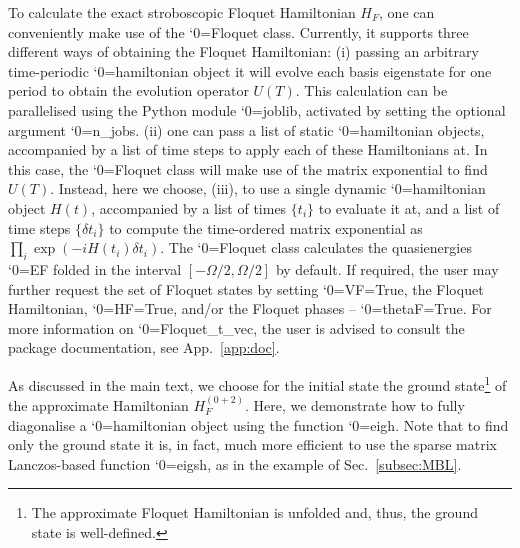 \documentclass{SciPost}
\newcommand\0{\scalebox{-1}[1]{0}}
\let\svttfamily\ttfamily
\renewcommand\ttfamily{\svttfamily\catcode`0=\active }
\renewcommand\texttt{\bgroup\ttfamily\texttthelp}
\def\texttthelp#1{#1\egroup}
\begin{document}

%
To calculate the exact stroboscopic Floquet Hamiltonian $H_F$, one can conveniently make use of the \texttt{Floquet} class. Currently, it supports three different ways of obtaining the Floquet Hamiltonian: (i) passing an arbitrary time-periodic \texttt{hamiltonian} object it will evolve each basis eigenstate for one period to obtain the evolution operator $U(T)$. This calculation can be parallelised using the Python module \texttt{joblib}, activated by setting the optional argument \texttt{n\_jobs}. (ii) one can pass a list of static \texttt{hamiltonian} objects, accompanied by a list of time steps to apply each of these Hamiltonians at. In this case, the \texttt{Floquet} class will make use of the matrix exponential to find $U(T)$. Instead, here we choose, (iii), to use a single dynamic \texttt{hamiltonian} object $H(t)$, accompanied by a list of times $\{t_i\}$ to evaluate it at, and a list of time steps $\{\delta t_i\}$ to compute the time-ordered matrix exponential as $\prod_i \exp(-iH(t_i)\delta t_i)$. The \texttt{Floquet} class calculates the quasienergies \texttt{EF} folded in the interval $[-\Omega/2,\Omega/2]$ by default. If required, the user may further request the set of Floquet states by setting \texttt{VF=True}, the Floquet Hamiltonian, \texttt{HF=True}, and/or the Floquet phases -- \texttt{thetaF=True}. For more information on \texttt{Floquet\_t\_vec}, the user is advised to consult the package documentation, see App.~\ref{app:doc}.

%
As discussed in the main text, we choose for the initial state the ground state\footnote{The approximate Floquet Hamiltonian is unfolded\cite{weinberg_FAPT} and, thus, the ground state is well-defined.} of the approximate Hamiltonian $H_F^{(0+2)}$. Here, we demonstrate how to fully diagonalise a \texttt{hamiltonian} object using the function \texttt{eigh}. Note that to find only the ground state it is, in fact, much more efficient to use the sparse matrix Lanczos-based function \texttt{eigsh}, as in the example of Sec.~\ref{subsec:MBL}.

%
\end{document}
